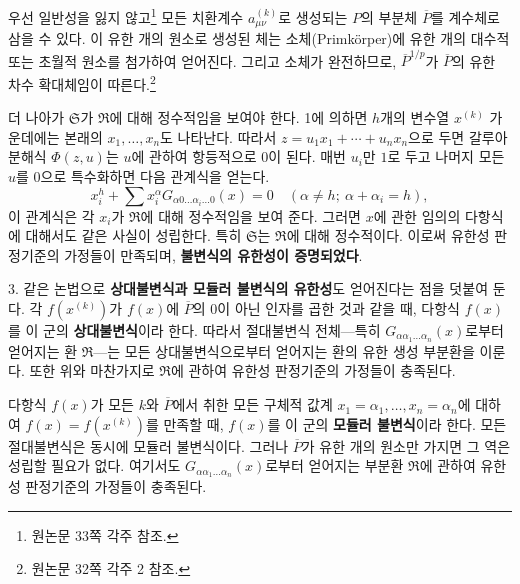 우선 일반성을 잃지 않고\footnote{원논문 33쪽 각주 참조.} 모든 치환계수 $a_{\mu\nu}^{(k)}$로 생성되는 $P$의 부분체 $\overline P$를 계수체로 삼을 수 있다. 이 유한 개의 원소로 생성된 체는 소체(Primkörper)에 유한 개의 대수적 또는 초월적 원소를 첨가하여 얻어진다. 그리고 소체가 완전하므로, $\overline P^{1/p}$가 $\overline P$의 유한 차수 확대체임이 따른다.\footnote{원논문 32쪽 각주 2 참조.}

더 나아가 $\mathfrak S$가 $\mathfrak R$에 대해 정수적임을 보여야 한다. 1에 의하면 $h$개의 변수열 $x^{(k)}$ 가운데에는 본래의 $x_1,\ldots,x_n$도 나타난다. 따라서 $z=u_1x_1+\cdots+u_nx_n$으로 두면 갈루아 분해식 $\Phi(z,u)$는 $u$에 관하여 항등적으로 $0$이 된다. 매번 $u_i$만 $1$로 두고 나머지 모든 $u$를 $0$으로 특수화하면 다음 관계식을 얻는다.
\[
 x_i^h+\sum x_i^\alpha G_{\alpha0\ldots\alpha_i\ldots0}(x)=0
 \quad (\alpha\ne h;\ \alpha+\alpha_i=h),
\]
이 관계식은 각 $x_i$가 $\mathfrak R$에 대해 정수적임을 보여 준다. 그러면 $x$에 관한 임의의 다항식에 대해서도 같은 사실이 성립한다. 특히 $\mathfrak S$는 $\mathfrak R$에 대해 정수적이다. 이로써 유한성 판정기준의 가정들이 만족되며, \textbf{불변식의 유한성이 증명되었다}.

3. 같은 논법으로 \textbf{상대불변식과 모듈러 불변식의 유한성}도 얻어진다는 점을 덧붙여 둔다. 각 $f(x^{(k)})$가 $f(x)$에 $\overline P$의 0이 아닌 인자를 곱한 것과 같을 때, 다항식 $f(x)$를 이 군의 \textbf{상대불변식}이라 한다. 따라서 절대불변식 전체---특히 $G_{\alpha\alpha_1\ldots\alpha_n}(x)$로부터 얻어지는 환 $\mathfrak R$---는 모든 상대불변식으로부터 얻어지는 환의 유한 생성 부분환을 이룬다. 또한 위와 마찬가지로 $\mathfrak R$에 관하여 유한성 판정기준의 가정들이 충족된다.

다항식 $f(x)$가 모든 $k$와 $\overline P$에서 취한 모든 구체적 값계 $x_1=\alpha_1,\ldots,x_n=\alpha_n$에 대하여 $f(x)=f(x^{(k)})$를 만족할 때, $f(x)$를 이 군의 \textbf{모듈러 불변식}이라 한다. 모든 절대불변식은 동시에 모듈러 불변식이다. 그러나 $\overline P$가 유한 개의 원소만 가지면 그 역은 성립할 필요가 없다. 여기서도 $G_{\alpha\alpha_1\ldots\alpha_n}(x)$로부터 얻어지는 부분환 $\mathfrak R$에 관하여 유한성 판정기준의 가정들이 충족된다.
